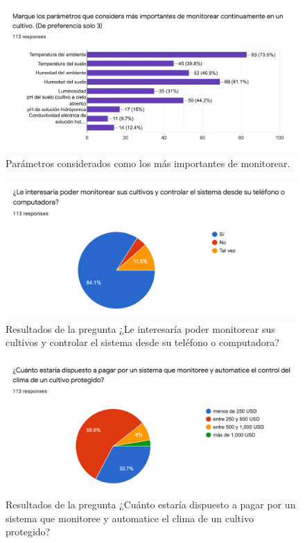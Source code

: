 \begin{figure}[!h]
	\centering
	\includegraphics[width=1\linewidth]{imagenes/encuesta/pregunta_6.png}
	\caption{Parámetros considerados como los más importantes de monitorear.}
	\label{fig:pregunta_6}
\end{figure}

\begin{figure}[!h]
	\centering
	\includegraphics[width=1\linewidth]{imagenes/encuesta/pregunta_7.png}
	\caption{Resultados de la pregunta ¿Le interesaría poder monitorear sus cultivos y controlar el sistema desde su teléfono o computadora?}
	\label{fig:pregunta_7}
\end{figure}

\begin{figure}[!h]
	\centering
	\includegraphics[width=1\linewidth]{imagenes/encuesta/pregunta_8.png}
	\caption{Resultados de la pregunta ¿Cuánto estaría dispuesto a pagar por un sistema que monitoree y automatice el clima de un cultivo protegido?}
	\label{fig:pregunta_8}
\end{figure}
